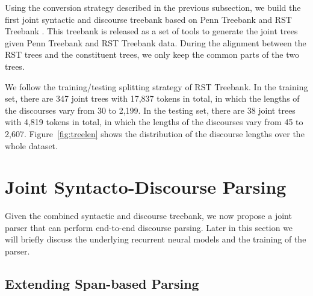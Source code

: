 \documentclass[11pt,letterpaper]{article}
\begin{document}
Using the conversion strategy described in the previous subsection, we build the first joint
syntactic and discourse
treebank based on Penn Treebank \cite{marcus1993building} and RST Treebank \cite{marcu2000rhetorical,marcu2000theory}.
This treebank is released as a set of tools to generate the joint trees 
given Penn Treebank and RST Treebank data.
During the alignment between the RST trees and the constituent trees,
we only keep the common parts of the two trees.

We follow the training/testing splitting strategy of RST Treebank.
In the training set, there are 347 joint trees with 
17,837 tokens in total,
in which the lengths of the discourses
vary from 30 to 2,199.
In the testing set, there are 38 joint trees
with 4,819 tokens in total,
in which the lengths of the discourses
vary from 45 to 2,607.
Figure~\ref{fig:treelen} shows the distribution of the discourse lengths
over the whole dataset.

 
\section{Joint Syntacto-Discourse Parsing}\label{sec:parsing}


Given the combined syntactic and discourse treebank, we now propose a joint parser
that can perform end-to-end discourse parsing. 
Later in this section we will briefly discuss the underlying recurrent neural models
and the training of the parser.

\subsection{Extending Span-based Parsing}
\end{document}
